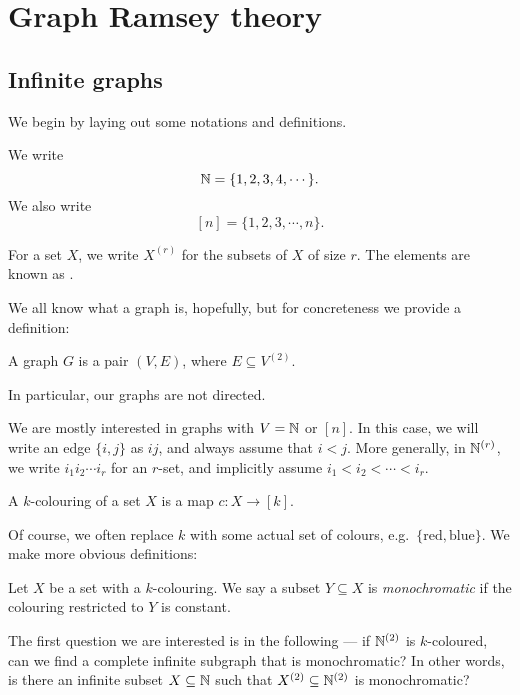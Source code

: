 \documentclass[a4paper]{article}
\begin{document}
\section{Graph Ramsey theory}
\subsection{Infinite graphs}
We begin by laying out some notations and definitions.
\begin{defi}\index{$\N$}\index{$[n]$}
  We write
  \[
    \mathbb{N} = \{1, 2, 3, 4, \cdots\}.
  \]
  We also write
  \[
    [n] = \{1, 2, 3, \cdots, n\}.
  \]
\end{defi}

\begin{notation}
  For a set $X$, we write $X^{(r)}$ for the subsets of $X$ of size $r$. The elements are known as .
\end{notation}

We all know what a graph is, hopefully, but for concreteness we provide a definition:
\begin{defi}[Graph]
  A graph $G$ is a pair $(V, E)$, where $E \subseteq V^{(2)}$.
\end{defi}
In particular, our graphs are not directed.

We are mostly interested in graphs with $V = \mathbb{N}$ or $[n]$. In this case, we will write an edge $\{i, j\}$ as $ij$, and always assume that $i < j$. More generally, in $\mathbb{N}^{(r)}$, we write $i_1 i_2 \cdots i_r$ for an $r$-set, and implicitly assume $i_1 < i_2 < \cdots < i_r$.

\begin{defi}[$k$-colouring]
  A $k$-colouring of a set $X$ is a map $c: X \to [k]$.
\end{defi}
Of course, we often replace $k$ with some actual set of colours, e.g.\ $\{\mathrm{red}, \mathrm{blue}\}$. We make more obvious definitions:

\begin{defi}
  Let $X$ be a set with a $k$-colouring. We say a subset $Y \subseteq X$ is \emph{monochromatic} if the colouring restricted to $Y$ is constant.
\end{defi}

The first question we are interested is in the following --- if $\mathbb{N}^{(2)}$ is $k$-coloured, can we find a complete infinite subgraph that is monochromatic? In other words, is there an infinite subset $X \subseteq \mathbb{N}$ such that $X^{(2)} \subseteq \mathbb{N}^{(2)}$ is monochromatic?
\end{document}
